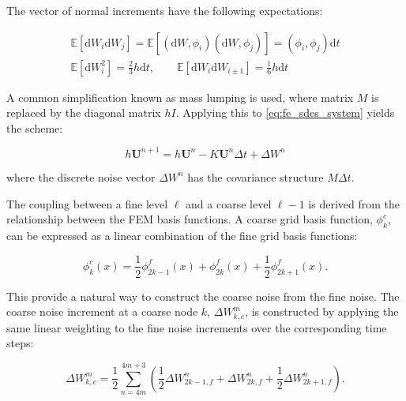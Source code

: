 The vector of normal increments have the following expectations:

\begin{align*}
    \mathbb{E}[\mathrm{d}W_i \mathrm{d}W_j] = \mathbb{E}[(\mathrm{d}W, \phi_i) 
    (\mathrm{d}W, \phi_j)] = (\phi_i, \phi_j)\mathrm{d}t\\
    \mathbb{E}[\mathrm{d}W_i^2] = \frac{2}{3}h \mathrm{d}t, \qquad 
    \mathbb{E}[\mathrm{d}W_i \mathrm{d}W_{i\pm 1}] = \frac{1}{6} h \mathrm{d}t
\end{align*}

A common simplification known as mass lumping is used, where
matrix $M$ is replaced by the diagonal matrix $hI$. 
Applying this to \eqref{eq:fe_sdes_system} yields the scheme:

\begin{equation*}
    h\mathbf{U}^{n+1} = h\mathbf{U}^n - K \mathbf{U}^n \Delta t + \Delta W^n
\end{equation*}

where the discrete noise vector $\Delta W^n$ has the covariance structure 
$M \Delta t$.

The coupling between a fine level $\ell$ and a coarse level $\ell-1$ is derived 
from the relationship between the FEM basis functions. A coarse grid basis 
function, $\phi_k^c$, can be expressed as a linear combination of the fine grid basis functions:

\begin{equation*}
    \phi_k^c(x) = \frac{1}{2} \phi_{2k-1}^f(x) + \phi_{2k}^f(x) + \frac{1}{2}\phi_{2k+1}^f(x).
\end{equation*}

This provide a natural way to construct the coarse noise from the fine noise. The coarse
noise increment at a coarse node $k$, $\Delta W_{k,c}^m$, is constructed by applying the same 
linear weighting to the fine noise increments over the corresponding time steps: 

\begin{equation}\label{eq:fe_coupling_eqn}
    \Delta W_{k,c}^m = \frac{1}{2} \sum_{n=4m}^{4m+3} \left( 
        \frac{1}{2}\Delta W_{2k-1,f}^n + \Delta W_{2k,f}^n + 
        \frac{1}{2}\Delta W_{2k+1,f}^n \right).
\end{equation}
